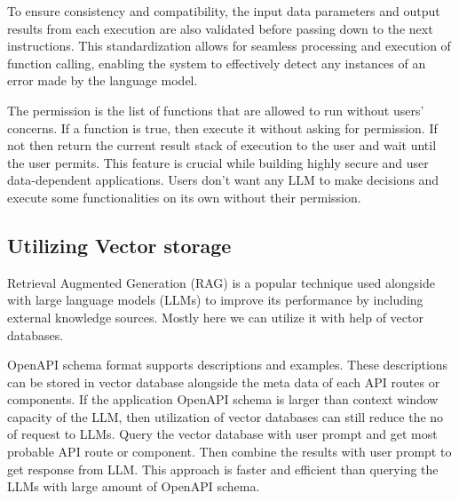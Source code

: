 \documentclass[conference]{IEEEtran}
\begin{document}
To ensure consistency and compatibility, the input data parameters and output results from each execution are also validated before passing down to the next instructions. This standardization allows for seamless processing and execution of function calling, enabling the system to effectively detect any instances of an error made by the language model.

The permission is the list of functions that are allowed to run without users' concerns. If a function is true, then execute it without asking for permission. If not then return the current result stack of execution to the user and wait until the user permits. This feature is crucial while building highly secure and user data-dependent applications. Users don’t want any LLM to make decisions and execute some functionalities on its own without their permission.







\subsection{Utilizing Vector storage}
Retrieval Augmented Generation (RAG) is a popular technique used alongside with large language models (LLMs) to improve its performance by including external knowledge sources. Mostly here we can utilize it with help of vector databases. 

OpenAPI schema format supports descriptions and examples. These descriptions can be stored in vector database alongside the meta data of each API routes or components. If the application OpenAPI schema is larger than context window capacity of the LLM, then utilization of vector databases can still reduce the no of request to LLMs. Query the vector database with user prompt and get most probable API route or component. Then combine the results with user prompt to get response from LLM. This approach is faster and efficient than querying the LLMs with large amount of OpenAPI schema.
\end{document}
